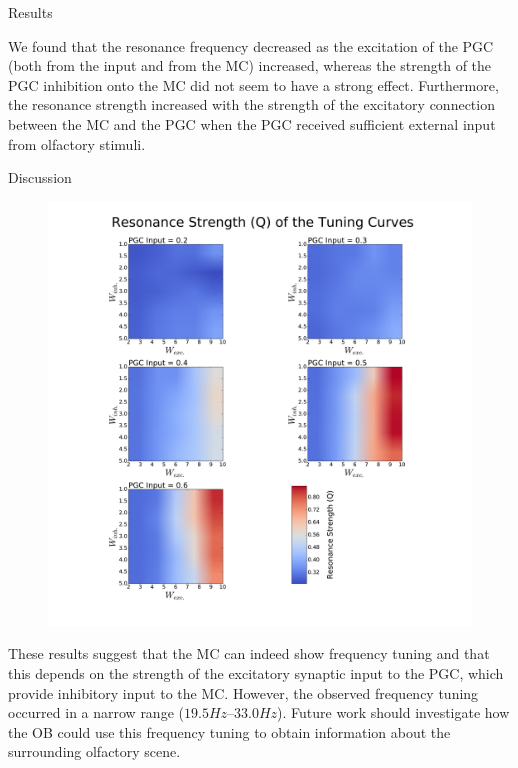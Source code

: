 \documentclass[final,hyperref={pdfpagelabels=false}]{beamer}
\begin{document}
\begin{frame}{}
\begin{columns}[t]
\begin{column}{.48\linewidth}
\begin{block}{Results}
\begin{figure}
      		\end{figure} 
        We found that the resonance frequency decreased as the excitation of the PGC (both from the input and from the MC) increased, whereas the strength of the PGC inhibition onto the MC did not seem to have a strong effect. 
        Furthermore, the resonance strength increased with the strength of the excitatory connection between the MC and the PGC when the PGC received sufficient external input from olfactory stimuli.
      \end{block}

      \begin{block}{Discussion}
      	\begin{figure}
      		\center
      		\includegraphics[scale=0.5]{images/Contour_plot_tuning_strength}
      		\end{figure} 
        These results suggest that the MC can indeed show frequency tuning and that this depends on the strength of the excitatory synaptic input to the PGC, which provide inhibitory input to the MC.
        However, the observed frequency tuning occurred in a narrow range ($19.5Hz – 33.0Hz$).
        Future work should investigate how the OB could use this frequency tuning to obtain information about the surrounding olfactory scene.
      \end{block}
    \end{column}
  \end{columns}
\end{frame}
\end{document}
